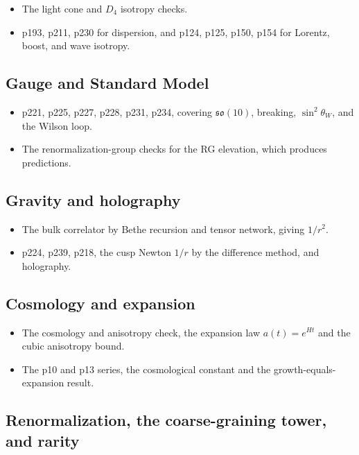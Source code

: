 \begin{itemize}
  \item The light cone and $D_4$ isotropy checks.
  \item p193, p211, p230 for dispersion, and p124, p125, p150, p154 for Lorentz, boost, and wave isotropy.
\end{itemize}

\subsection{Gauge and Standard Model}

\begin{itemize}
  \item p221, p225, p227, p228, p231, p234, covering $\mathfrak{so}(10)$, breaking,
  $\sin^2\theta_W$, and the Wilson loop.
  \item The renormalization-group checks for the RG elevation, which produces predictions.
\end{itemize}

\subsection{Gravity and holography}

\begin{itemize}
  \item The bulk correlator by Bethe recursion and tensor network, giving $1/r^2$.
  \item p224, p239, p218, the cusp Newton $1/r$ by the difference method, and holography.
\end{itemize}

\subsection{Cosmology and expansion}

\begin{itemize}
  \item The cosmology and anisotropy check, the expansion law $a(t) = e^{Ht}$ and the cubic anisotropy bound.
  \item The p10 and p13 series, the cosmological constant and the growth-equals-expansion result.
\end{itemize}

\subsection{Renormalization, the coarse-graining tower, and rarity}

